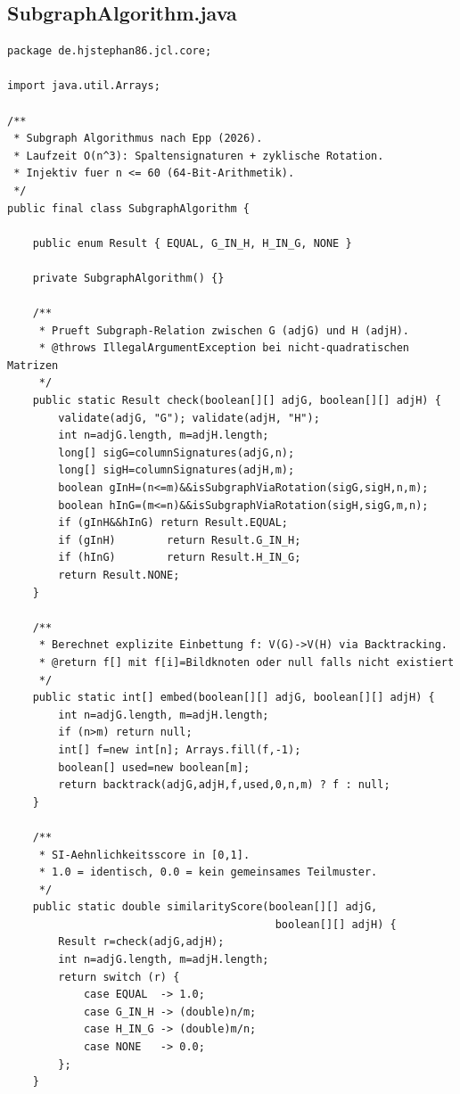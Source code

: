 ﻿\documentclass[a4paper,12pt]{article}
\theoremstyle{definition}
\begin{document}
\subsection{SubgraphAlgorithm.java}

\begin{lstlisting}[style=javastyle,
    caption={SubgraphAlgorithm.java -- Kern-SI-Implementierung nach Epp (2026)}]
package de.hjstephan86.jcl.core;

import java.util.Arrays;

/**
 * Subgraph Algorithmus nach Epp (2026).
 * Laufzeit O(n^3): Spaltensignaturen + zyklische Rotation.
 * Injektiv fuer n <= 60 (64-Bit-Arithmetik).
 */
public final class SubgraphAlgorithm {

    public enum Result { EQUAL, G_IN_H, H_IN_G, NONE }

    private SubgraphAlgorithm() {}

    /**
     * Prueft Subgraph-Relation zwischen G (adjG) und H (adjH).
     * @throws IllegalArgumentException bei nicht-quadratischen Matrizen
     */
    public static Result check(boolean[][] adjG, boolean[][] adjH) {
        validate(adjG, "G"); validate(adjH, "H");
        int n=adjG.length, m=adjH.length;
        long[] sigG=columnSignatures(adjG,n);
        long[] sigH=columnSignatures(adjH,m);
        boolean gInH=(n<=m)&&isSubgraphViaRotation(sigG,sigH,n,m);
        boolean hInG=(m<=n)&&isSubgraphViaRotation(sigH,sigG,m,n);
        if (gInH&&hInG) return Result.EQUAL;
        if (gInH)        return Result.G_IN_H;
        if (hInG)        return Result.H_IN_G;
        return Result.NONE;
    }

    /**
     * Berechnet explizite Einbettung f: V(G)->V(H) via Backtracking.
     * @return f[] mit f[i]=Bildknoten oder null falls nicht existiert
     */
    public static int[] embed(boolean[][] adjG, boolean[][] adjH) {
        int n=adjG.length, m=adjH.length;
        if (n>m) return null;
        int[] f=new int[n]; Arrays.fill(f,-1);
        boolean[] used=new boolean[m];
        return backtrack(adjG,adjH,f,used,0,n,m) ? f : null;
    }

    /**
     * SI-Aehnlichkeitsscore in [0,1].
     * 1.0 = identisch, 0.0 = kein gemeinsames Teilmuster.
     */
    public static double similarityScore(boolean[][] adjG,
                                          boolean[][] adjH) {
        Result r=check(adjG,adjH);
        int n=adjG.length, m=adjH.length;
        return switch (r) {
            case EQUAL  -> 1.0;
            case G_IN_H -> (double)n/m;
            case H_IN_G -> (double)m/n;
            case NONE   -> 0.0;
        };
    }


\end{lstlisting}
\end{document}
